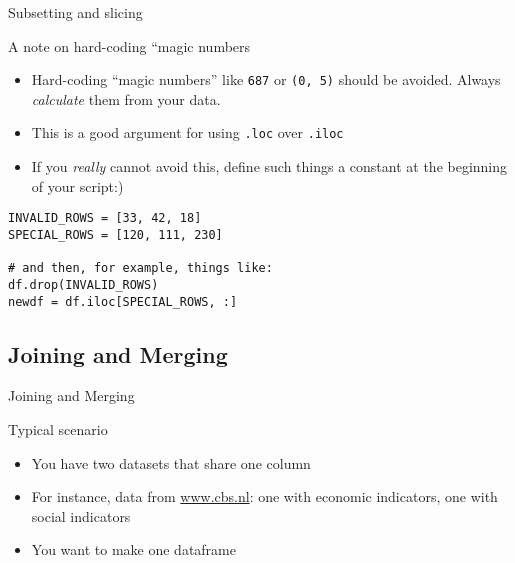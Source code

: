 \begin{frame}[fragile]{Subsetting and slicing }
  \begin{block}{A note on hard-coding ``magic numbers}
    \begin{itemize}
    \item Hard-coding ``magic numbers'' like \texttt{687} or \texttt{(0, 5)} should be avoided. Always \emph{calculate} them from your data.
    \item This is a good argument for using \texttt{.loc} over \texttt{.iloc}
    \item If you \emph{really} cannot avoid this, define such things a constant at the beginning of your script:)      
    \end{itemize}
  \end{block}

\begin{verbatim}
INVALID_ROWS = [33, 42, 18]
SPECIAL_ROWS = [120, 111, 230]

# and then, for example, things like:
df.drop(INVALID_ROWS)
newdf = df.iloc[SPECIAL_ROWS, :]
\end{verbatim}
  
\end{frame}



\subsection{Joining and Merging}

\begin{frame}{Joining and Merging}
\begin{block}{Typical scenario}
	\begin{itemize}
		\item You have two datasets that share one column
		\item For instance, data from \url{www.cbs.nl}: one with economic indicators, one with social indicators
		\item You want to make one dataframe
	\end{itemize}
\end{block}
\end{frame}




{
	\begin{frame}[plain]
\end{frame}
	\begin{frame}[plain]
\end{frame}
}

